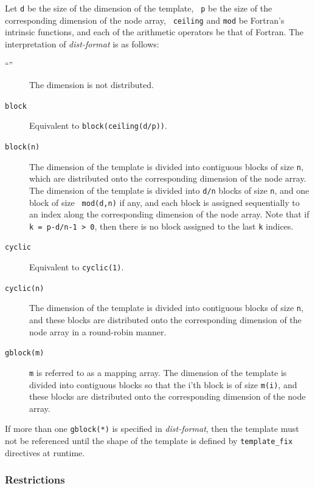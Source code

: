 Let {\tt d} be the size of the dimension of the template, {\tt
p} be the size of the corresponding dimension of the node array, {\tt
ceiling} and {\tt mod} be Fortran's intrinsic functions, and each of the
arithmetic operators be that of Fortran.
%
The interpretation of {\it dist-format} is as follows:

\begin{description}
\item[``{\tt *}'']
	   The dimension is not distributed.

\item[{\tt block}]
	   Equivalent to {\tt block(ceiling(d/p))}.

\item[{\tt block(n)}]

	   The dimension of the template is divided into
	   contiguous blocks of size {\tt n}, which are distributed onto
	   the corresponding dimension of the node array.
%
	   The dimension of the template is divided into {\tt d/n}
	   blocks of size {\tt n}, and one block of size {\tt
	   mod(d,n)} if any, and each block is assigned sequentially
	   to an index along the corresponding dimension of the node
	   array.
%
	   Note that if {\tt k = p-d/n-1 > 0}, then there is no block
	   assigned to the last {\tt k} indices.


\item[{\tt cyclic}]
	   Equivalent to {\tt cyclic(1)}.

\item[{\tt cyclic(n)}]
	   The dimension of the template is divided into
	   contiguous blocks of size {\tt n}, and these blocks are
	   distributed onto the corresponding dimension of the node
	   array in a round-robin manner.

\item[{\tt gblock(m)}]
	   {\tt m} is referred to as a mapping array. The dimension of
	   the template is divided into contiguous blocks so that the
	   i'th block is of size {\tt m(i)}, and these blocks are
	   distributed onto the corresponding dimension of the node array.
\end{description}

If more than one {\tt gblock(*)} is specified in {\it dist-format},
then the template must not be referenced until the shape of the template
is defined by {\tt template\_fix} directives at runtime.


\subsubsection*{Restrictions}

